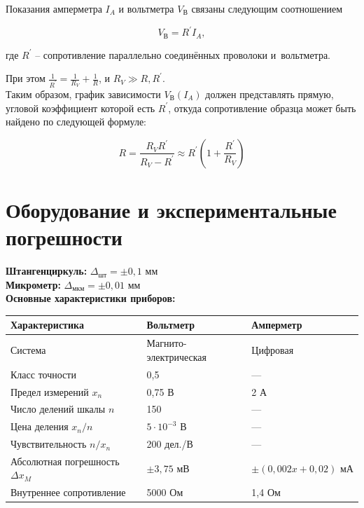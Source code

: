 \documentclass[a4paper,12pt]{article} %
\begin{document}
\medskip

Показания амперметра $I_A$ и вольтметра $V_\text{В}$ связаны следующим соотношением

\begin{equation}
V_\text{В}=R^\prime I_A,
\end{equation}

\noindent где $R^\prime$ -- сопротивление параллельно соединённых проволоки и~вольтметра.

\medskip

При этом $\frac{1}{R^\prime} = \frac{1}{R_V} + \frac{1}{R}$, и $R_V \gg R, R^\prime$.\\

Таким образом, график зависимости $V_\text{В}\left(I_A\right)$ должен представлять прямую, угловой коэффициент которой есть $R^\prime$, откуда сопротивление образца может быть найдено по следующей формуле:

\begin{equation}\label{r_provoloki}
R = \dfrac{R_V R^\prime}{R_V - R^\prime} \approx R^\prime \left( 1 + \frac{R^\prime}{R_V} \right) 
\end{equation}

\section{Оборудование и экспериментальные погрешности}

\textbf{Штангенциркуль:} $\Delta_\text{шт} = \pm 0,1$ мм \\
\textbf{Микрометр:} $\Delta_\text{мкм} = \pm 0,01 $ мм \\
\textbf{Основные характеристики приборов:} 

\begin{tabular}[]{|l|l|l|}
\hline
Характеристика & Вольтметр & Амперметр \\
\hline
Система & Магнито-электрическая & Цифровая \\
\hline
Класс точности & 0,5 & — \\
\hline
Предел измерений $x_n$ & 0,75 В & 2 А \\
\hline
Число делений шкалы $n$ & 150 & — \\
\hline
Цена деления $x_n/n$ & $5 \cdot 10^{-3} \text{ В}$ & — \\
\hline
Чувствительность $n/x_n$ & 200 дел./В & — \\
\hline
Абсолютная погрешность $\Delta x_M$ & $\pm3,75\text{ мВ}$ & $\pm(0,002x + 0,02)\text{ мА}$ \\
\hline
Внутреннее сопротивление& 5000 Ом & 1,4 Ом \\
\hline
\end{tabular}\\
\end{document}
